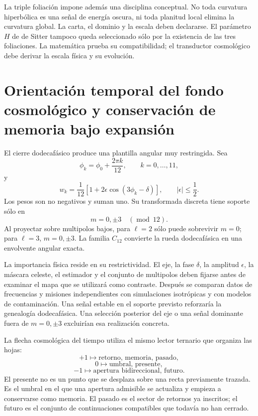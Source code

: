La triple foliación impone además una disciplina conceptual. No toda curvatura
hiperbólica es una señal de energía oscura, ni toda planitud local elimina la
curvatura global. La carta, el dominio y la escala deben declararse. El parámetro
\(H\) de de Sitter tampoco queda seleccionado sólo por la existencia de las tres
foliaciones. La matemática prueba su compatibilidad; el transductor cosmológico debe
derivar la escala física y su evolución.

\section{Orientación temporal del fondo cosmológico y conservación de memoria bajo expansión}

El cierre dodecafásico produce una plantilla angular muy restringida. Sea
\[
 \phi_k=\phi_0+\frac{2\pi k}{12},
 \qquad k=0,\ldots,11,
\]
y
\[
 w_k
 =
 \frac1{12}
 \left[
 1+2\epsilon\cos(3\phi_k-\delta)
 \right],
 \qquad
 |\epsilon|\leq\frac12.
\]
Los pesos son no negativos y suman uno. Su transformada discreta tiene soporte sólo
en
\[
  m=0,\pm3\quad(\operatorname{mod}\ 12).
\]
Al proyectar sobre multipolos bajos, para \(\ell=2\) sólo puede sobrevivir
\(m=0\); para \(\ell=3\), \(m=0,\pm3\). La familia \(C_{12}\) convierte la rueda
dodecafásica en una envolvente angular exacta.

La importancia física reside en su restrictividad. El eje, la fase \(\delta\), la
amplitud \(\epsilon\), la máscara celeste, el estimador y el conjunto de multipolos
deben fijarse antes de examinar el mapa que se utilizará como contraste. Después se
comparan datos de frecuencias y misiones independientes con simulaciones isotrópicas
y con modelos de contaminación. Una señal estable en el soporte previsto reforzaría
la genealogía dodecafásica. Una selección posterior del eje o una señal dominante
fuera de \(m=0,\pm3\) excluirían esa realización concreta.

La flecha cosmológica del tiempo utiliza el mismo lector ternario que organiza las
hojas:
\[
 +1
 \longmapsto
 \text{retorno, memoria, pasado},
\]
\[
 0
 \longmapsto
 \text{umbral, presente},
\]
\[
 -1
 \longmapsto
 \text{apertura bidireccional, futuro}.
\]
El presente no es un punto que se desplaza sobre una recta previamente trazada. Es
el umbral en el que una apertura admisible se actualiza y empieza a conservarse como
memoria. El pasado es el sector de retornos ya inscritos; el futuro es el conjunto
de continuaciones compatibles que todavía no han cerrado.

